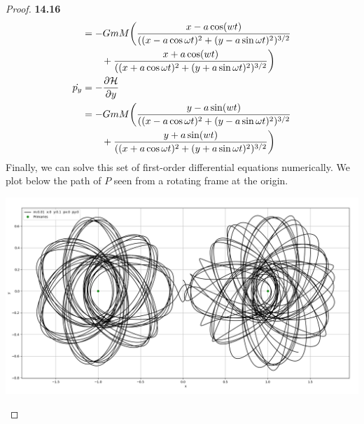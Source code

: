 \documentclass[11pt]{article}
\theoremstyle{definition}
\begin{document}
\begin{proof}{\textbf{14.16}}
\begin{align*}
        &= -GmM\bigg(
        \frac{x - a\cos(wt)}{((x - a\cos \omega t)^2 + (y - a\sin \omega t)^2)^{3/2}}\\
        &\quad\quad +
        \frac{x + a\cos(wt)}{((x + a\cos \omega t)^2 + (y + a\sin \omega t)^2)^{3/2}}
        \bigg)\\
        \dot{p_y} &= -\partialderivative{\mathcal{H}}{y}\\
        &= -GmM\bigg(
        \frac{y - a\sin(wt)}{((x - a\cos \omega t)^2 + (y - a\sin \omega t)^2)^{3/2}}\\
        &\quad\quad +
        \frac{y + a\sin(wt)}{((x + a\cos \omega t)^2 + (y + a\sin \omega t)^2)^{3/2}}
        \bigg)
    \end{align*}
    Finally, we can solve this set of first-order differential equations
    numerically. We plot below the path of $P$ seen from a rotating frame at
    the origin. 
    \begin{center}
        \includegraphics[scale=0.3]{ch14-16.png}
    \end{center}
\end{proof}
\end{document}
